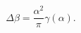 \begin{equation}\label{Delta_Beta}
\Delta\beta = \frac{\alpha^2}{\pi}\gamma(\alpha).
\end{equation}


